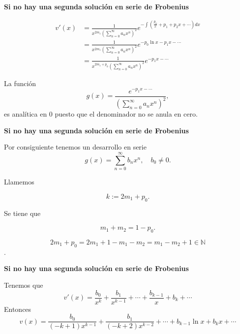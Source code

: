 \begin{frame}[fragile]{\textbf{Si no hay una segunda solución en serie de Frobenius}}

\[
   \begin{split}
     v'(x)&=\frac{1}{x^{2m_1}\left(\sum_{n=0}^{\infty}a_nx^n\right)^2}e^{-\int \left(\frac{p_0}{x}+p_1+p_2x+\cdots \right)dx}\\
  &= \frac{1}{x^{2m_1}\left(\sum_{n=0}^{\infty}a_nx^n\right)^2}e^{-p_0 \ln x -p_1x-\cdots }\\
  &= \frac{1}{x^{2m_1+p_0}\left(\sum_{n=0}^{\infty}a_nx^n\right)^2}e^{ -p_1x-\cdots }
   \end{split}
\]

La función
\[
  g(x)= \frac{ e^{ -p_1x-\cdots } }{\left(\sum_{n=0}^{\infty}a_nx^n\right)^2},
\]
es analítica en $0$ puesto que el denominador no se anula en cero. 

\end{frame}



\begin{frame}[fragile]{\textbf{Si no hay una segunda solución en serie de Frobenius}}


Por consiguiente tenemos un desarrollo en serie
\[ g(x)=\sum_{n=0}^{\infty}b_nx^n, \quad b_0\neq 0.\]

Llamemos 

\[k:=2m_1+p_0.\]

Se tiene que 

\[m_1+m_2=1-p_0.\] 

\[2m_1+p_0=2m_1+1-m_1-m_2=m_1-m_2+1\in\mathbb{N}\].

\end{frame}



\begin{frame}[fragile]{\textbf{Si no hay una segunda solución en serie de Frobenius}}

Tenemos que
\[v'(x)=\frac{b_0}{x^k}+ \frac{b_1}{x^{k-1}}+\cdots+\frac{b_{k-1}}{x}+b_{k}+\cdots\]
Entonces
\[v(x)=\frac{b_0}{(-k+1)x^{k-1}}+ \frac{b_1}{(-k+2)x^{k-2}}+\cdots+b_{k-1}\ln x+b_{k}x+\cdots\]

\end{frame}



